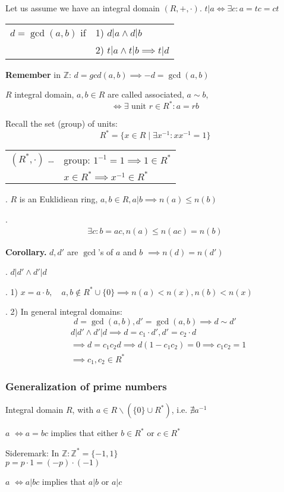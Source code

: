 Let us assume we have an integral domain $(R,+, \cdot)$.
$t|a \Leftrightarrow \exists c: a=tc =ct$
\begin{tabular}{ll}
$d=\gcd(a,b)$ if & 1) $d|a \land d|b$ \\
  & 2) $t|a \land t|b \implies t|d$
\end{tabular}

\textbf{Remember}
in $\mathbb{Z}$: $d = gcd(a,b) \implies -d = \gcd(a,b)$

\begin{definition}
$R$ integral domain,
$a,b \in R$ are called associated, $a \sim b$,
\[
  \Leftrightarrow \exists \text{ unit } r \in R^{*}: a = rb
\]
\end{definition}

Recall the set (group) of units:
\[
  R^{*} = \{ x \in R \mid \exists x^{-1} : xx^{-1} = 1\}
\]
\begin{tabular}{ll}
  $(R^{*}, \cdot)$ \ldots
    & group: $1^{-1} = 1 \implies 1 \in R^{*}$ \\
    & $x\in R^{*} \implies x^{-1} \in R^{*}$
\end{tabular}

\Theorem.
$R$ is an Euklidiean ring, $a,b\in R, a|b \implies n(a) \leq n(b)$

\Proof.
\begin{align*}
  \exists c : b = ac, n(a) \leq n(ac) = n(b)
\end{align*}

\textbf{Corollary.}
$d, d'$ are $\gcd$'s of $a$ and $b$ $\implies n(d) = n(d')$

\Proof.
$d|d' \land d' | d$


\Remark.
1) $x = a\cdot b, \quad a,b\not\in R^{*} \cup \{0\} \implies n(a) < n(x), n(b) < n(x)$

\Remark.
2) In general integral domains:
\[
  d= \gcd(a,b), d' = \gcd(a,b) \implies d \sim d'
\]
\begin{align*}
  &d|d' \land d'|d \implies d = c_1\cdot d', d' = c_2 \cdot d \\
  &\implies d = c_1c_2 d \implies d (1-c_1c_2) = 0 \implies c_1 c_2 = 1\\
  &\implies c_1,c_2 \in R^{*}
\end{align*}

\subsubsection{Generalization of prime numbers}
\begin{definition}
  Integral domain $R$, with $a\in R \backslash (\{0\}\cup R^{*})$, i.e. $\nexists a^{-1}$

$a$  $\Leftrightarrow a = bc$ implies that either $b\in R^{*}$ or $c\in R^{*}$

Sideremark:
In $\mathbb{Z}: \mathbb{Z}^{*} = \{-1, 1\}$ \\
$p = p \cdot 1 = (-p) \cdot (-1)$

$a$  $\Leftrightarrow a | bc$ implies that $a|b$ or $a|c$
\end{definition}

